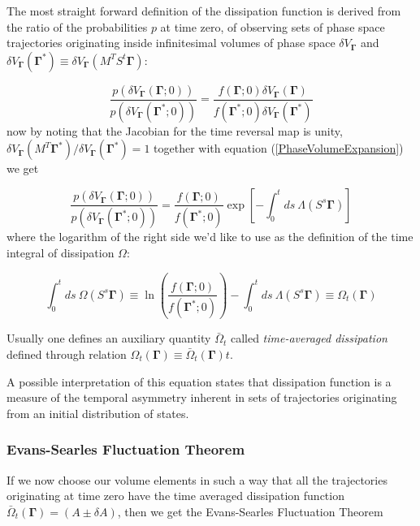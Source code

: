 \documentclass[a4paper,12pt,nofootinbib]{article}
\begin{document}
The most straight forward definition of the dissipation function is derived from the ratio of the probabilities $p$ at time zero, of observing sets of phase space trajectories originating inside infinitesimal volumes of phase space $\delta V_{\bm{\Gamma}}$ and $\delta V_{\bm{\Gamma}}(\bm{\Gamma}^*)\equiv \delta V_{\bm{\Gamma}}(M^T S^t \bm{\Gamma})$:

\begin{equation}
  \frac{p(\delta V_{\bm{\Gamma}}(\bm{\Gamma};0))}{p(\delta V_{\bm{\Gamma}}(\bm{\Gamma}^*;0))}= \frac{f(\bm{\Gamma};0)\delta V_{\bm{\Gamma}}(\bm{\Gamma})}{f(\bm{\Gamma}^*;0)\delta V_{\bm{\Gamma}}(\bm{\Gamma}^*)}
\end{equation}
now by noting that the Jacobian for the time reversal map is unity, 
\newline $ \delta V_{\bm{\Gamma}}(M^T \bm{\Gamma}^*)/ \delta V_{\bm{\Gamma}}(\bm{\Gamma}^*) =1 $ together with equation (\ref{PhaseVolumeExpansion}) we get


\begin{equation}
  \frac{p(\delta V_{\bm{\Gamma}}(\bm{\Gamma};0))}{p(\delta V_{\bm{\Gamma}}(\bm{\Gamma}^*;0))}=\frac{f(\bm{\Gamma};0)}{f(\bm{\Gamma}^*;0)} 
  \exp[-\int_0^t ds \ \Lambda(S^s \bm{\Gamma})]
\end{equation}
where the logarithm of the right side we'd like to use as the definition of the time integral of dissipation $\Omega$:

\begin{equation}
  \label{Dissipation}
  \int_0^t ds\ \Omega(S^s \bm{\Gamma})\equiv \ln(\frac{f(\bm{\Gamma};0)}{f(\bm{\Gamma}^*;0)}) -\int_0^t ds \ \Lambda(S^s \bm{\Gamma}) \equiv \Omega_t(\bm{\Gamma})
\end{equation}

Usually one defines an auxiliary quantity $\bar{\Omega}_t$ called \textit{time-averaged dissipation} defined through relation $\Omega_t(\bm{\Gamma}) \equiv \bar{\Omega}_t(\bm{\Gamma})t$.

A possible interpretation of this equation states that dissipation function is a measure of the temporal asymmetry inherent in sets of trajectories originating from an initial distribution of states.

\subsubsection{Evans-Searles Fluctuation Theorem}

If we now choose our volume elements in such a way that all the trajectories originating at time zero have the time averaged dissipation function $\bar{\Omega}_t(\bm{\Gamma})=(A \pm \delta A)$, then we get the Evans-Searles Fluctuation Theorem
\end{document}
